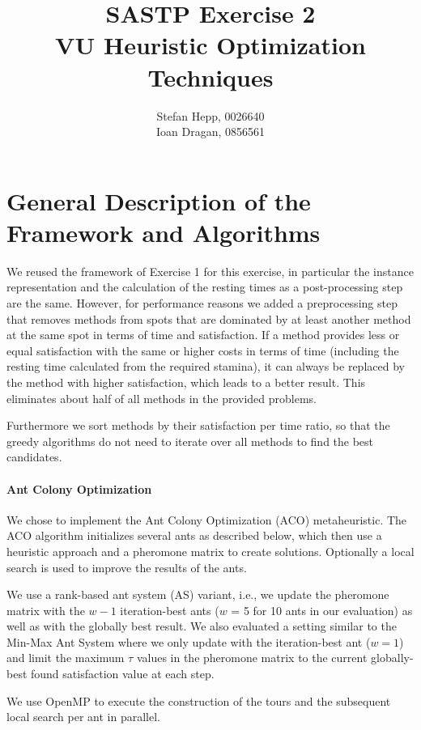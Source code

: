 \documentclass{article}
\title{SASTP Exercise 2\\
{VU Heuristic Optimization Techniques} }
\author{Stefan Hepp, 0026640 \\
Ioan Dragan, 0856561 }
\begin{document}
\maketitle
\section{General Description of the Framework and Algorithms}

We reused the framework of Exercise 1 for this exercise, in particular the instance representation and the calculation of the resting times
as a post-processing step are the same. However, for performance reasons we added a preprocessing step that removes methods from spots that
are dominated by at least another method at the same spot in terms of time and satisfaction. If a method provides less or equal satisfaction
with the same or higher costs in terms of time (including the resting time calculated from the required stamina), it can always be replaced
by the method with higher satisfaction, which leads to a better result. This eliminates about half of all methods in the provided problems. 

Furthermore we sort methods by their satisfaction per time ratio, so that the greedy algorithms do not need to iterate over all methods to find the best candidates.

\paragraph{Ant Colony Optimization}

We chose to implement the Ant Colony Optimization (ACO) metaheuristic. The ACO algorithm initializes several ants as described below, which
then use a heuristic approach and a pheromone matrix to create solutions. Optionally a local search is used to improve the results of the
ants. 

We use a rank-based ant system (AS) variant, i.e., we update the pheromone matrix with the $w-1$ iteration-best ants ($w$ = 5 for 10 ants in our
evaluation) as well as with the globally best result. We also evaluated a setting similar to the Min-Max Ant System where we only update
with the iteration-best ant ($w=1$) and limit the maximum $\tau$ values in the pheromone matrix to the current globally-best found
satisfaction value at each step.

We use OpenMP to execute the construction of the tours and the subsequent local search per ant in parallel.
\end{document}
